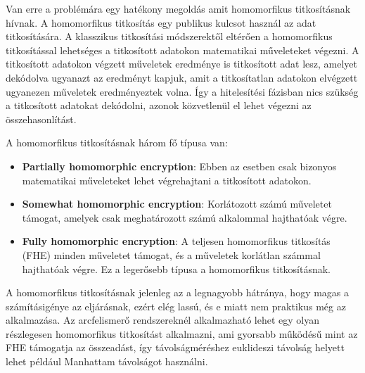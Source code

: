 Van erre a problémára egy hatékony megoldás amit homomorfikus titkosításnak hívnak. A homomorfikus titkosítás egy publikus kulcsot használ az adat titkosítására. A klasszikus titkosítási módszerektől eltérően a homomorfikus titkosítással lehetséges a titkosított adatokon matematikai műveleteket végezni. A titkosított adatokon végzett műveletek eredménye is titkosított adat lesz, amelyet dekódolva ugyanazt az eredményt kapjuk, amit a titkosítatlan adatokon elvégzett ugyanezen műveletek eredményeztek volna. Így a hitelesítési fázisban nics szükség a titkosított adatokat dekódolni, azonok közvetlenül el lehet végezni az összehasonlítást. 

A homomorfikus titkosításnak három fő típusa van:
\begin{itemize}
	\item \textbf{Partially homomorphic encryption}: Ebben az esetben csak bizonyos matematikai műveleteket lehet végrehajtani a titkosított adatokon.
	\item \textbf{Somewhat homomorphic encryption}: Korlátozott számú műveletet támogat, amelyek csak meghatározott számú alkalommal hajthatóak végre.
	\item \textbf{Fully homomorphic encryption}: A teljesen homomorfikus titkosítás (FHE) minden műveletet támogat, és a műveletek korlátlan számmal hajthatóak végre. Ez a legerősebb típusa a homomorfikus titkosításnak. 
\end{itemize}

A homomorfikus titkosításnak jelenleg az a legnagyobb hátránya, hogy magas a számításigénye az eljárásnak, ezért elég lassú, és e miatt nem praktikus még az alkalmazása. Az arcfelismerő rendszereknél alkalmazható lehet egy olyan részlegesen homomorfikus titkosítást alkalmazni, ami gyorsabb működésű mint az FHE támogatja az összeadást, így távolságméréshez euklideszi távolság helyett lehet például Manhattam távolságot használni.



